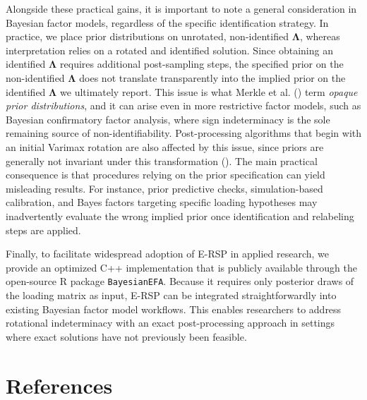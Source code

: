 \documentclass[
  man,
  longtable,
  nolmodern,
  notxfonts,
  notimes,
  colorlinks=true,linkcolor=blue,citecolor=blue,urlcolor=blue]{apa7}
\theoremstyle{plain}
\theoremstyle{plain}
\theoremstyle{remark}
\begin{document}
Alongside these practical gains, it is important to note a general
consideration in Bayesian factor models, regardless of the specific
identification strategy. In practice, we place prior distributions on
unrotated, non-identified \(\mathbf\Lambda\), whereas interpretation
relies on a rotated and identified solution. Since obtaining an
identified \(\mathbf\Lambda\) requires additional post-sampling steps,
the specified prior on the non-identified \(\mathbf\Lambda\) does not
translate transparently into the implied prior on the identified
\(\mathbf\Lambda\) we ultimately report. This issue is what Merkle et
al. () term \emph{opaque prior
distributions}, and it can arise even in more restrictive factor models,
such as Bayesian confirmatory factor analysis, where sign indeterminacy
is the sole remaining source of non-identifiability. Post-processing
algorithms that begin with an initial Varimax rotation are also affected
by this issue, since priors are generally not invariant under this
transformation ().
The main practical consequence is that procedures relying on the prior
specification can yield misleading results. For instance, prior
predictive checks, simulation-based calibration, and Bayes factors
targeting specific loading hypotheses may inadvertently evaluate the
wrong implied prior once identification and relabeling steps are
applied.

Finally, to facilitate widespread adoption of E-RSP in applied research,
we provide an optimized C++ implementation that is publicly available
through the open-source R package \texttt{BayesianEFA}. Because it
requires only posterior draws of the loading matrix as input, E-RSP can
be integrated straightforwardly into existing Bayesian factor model
workflows. This enables researchers to address rotational indeterminacy
with an exact post-processing approach in settings where exact solutions
have not previously been feasible.

\newpage

\section{References}\label{references}
\end{document}
